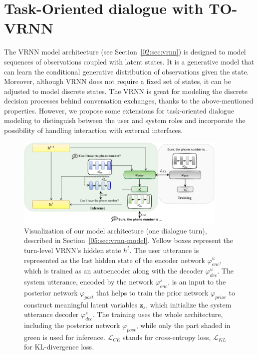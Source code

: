 \section{Task-Oriented dialogue with TO-VRNN}
The VRNN model architecture (see Section~\ref{02:sec:vrnn}) is designed to model sequences of observations coupled with latent states.
It is a generative model that can learn the conditional generative distribution of observations given the state.
Moreover, although VRNN does not require a fixed set of states, it can be adjusted to model discrete states.
The VRNN is great for modeling the discrete decision processes behind conversation exchanges, thanks to the above-mentioned properties.
However, we propose some extensions for task-oriented dialogue modeling to distinguish between the user and system roles and incorporate the possibility of handling interaction with external interfaces.
\begin{figure}[t]
    \centering
    \includegraphics[width=0.9\textwidth]{images/vrnn-diagram.pdf}
    \caption{Visualization of our model architecture (one dialogue turn), described in Section~\ref{05:sec:vrnn-model}. Yellow boxes represent the turn-level VRNN's hidden state $h^t$. The user utterance is represented as the last hidden state of the encoder network $\varphi_{enc}^u$, which is trained as an autoencoder along with the decoder $\varphi_{dec}^u$. The system utterance, encoded by the network $\varphi_{enc}^s$, is an input to the posterior network $\varphi_{post}$ that helps to train the prior network $\varphi_{prior}$ to construct meaningful latent variables $\mathbf{z}_s$, which initialize the system utterance decoder $\varphi_{dec}^s$. The training uses the whole architecture, including the posterior network $\varphi_{post}$, while only the part shaded in green is used for inference. $\mathcal{L}_{CE}$ stands for cross-entropy loss, $\mathcal{L}_{KL}$ for KL-divergence loss.}
    \label{05:fig:vrnn_method}
\end{figure}

